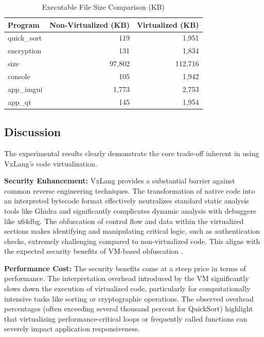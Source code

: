 \begin{table}[!t]
  \centering
  \caption{Executable File Size Comparison (KB)}
  \label{tab:file_size}
    \begin{tabular}{@{}lrr@{}}
        \toprule
        \textbf{Program} & \textbf{Non-Virtualized (KB)} & \textbf{Virtualized (KB)} \\
        \midrule
        quick\_sort      & 119        & 1,951      \\
        encryption       & 131        & 1,834      \\
        size             & 97,802     & 112,716    \\
        console          & 105        & 1,942      \\
        app\_imgui       & 1,773      & 2,753      \\
        app\_qt          & 145        & 1,954      \\
        \bottomrule
    \end{tabular}
\end{table}

\subsection{Discussion}
The experimental results clearly demonstrate the core trade-off inherent in using VxLang's code virtualization.

\textbf{Security Enhancement:} VxLang provides a substantial barrier against common reverse engineering techniques. The transformation of native code into an interpreted bytecode format effectively neutralizes standard static analysis tools like Ghidra and significantly complicates dynamic analysis with debuggers like x64dbg. The obfuscation of control flow and data within the virtualized sections makes identifying and manipulating critical logic, such as authentication checks, extremely challenging compared to non-virtualized code. This aligns with the expected security benefits of VM-based obfuscation \cite{Ore06, Sal18}.

\textbf{Performance Cost:} The security benefits come at a steep price in terms of performance. The interpretation overhead introduced by the VM significantly slows down the execution of virtualized code, particularly for computationally intensive tasks like sorting or cryptographic operations. The observed overhead percentages (often exceeding several thousand percent for QuickSort) highlight that virtualizing performance-critical loops or frequently called functions can severely impact application responsiveness.

